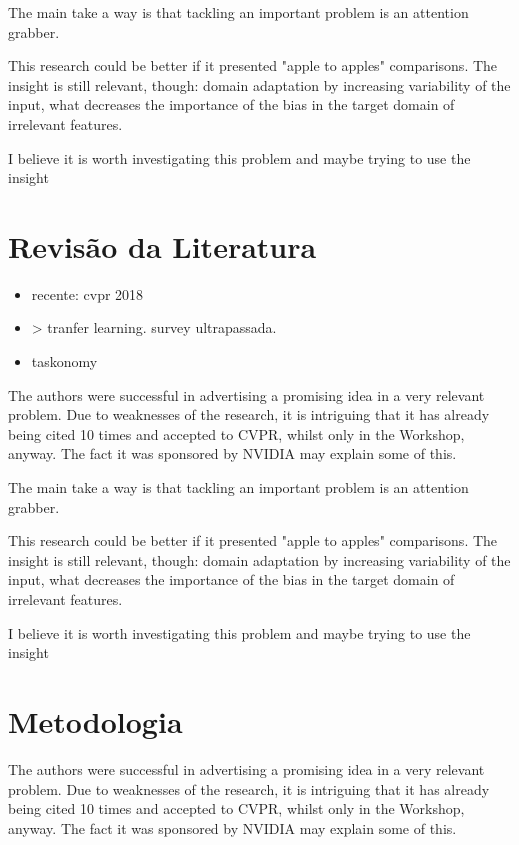 \documentclass[
12pt, %
a4paper, %
onecolumn, %
]{article}
\begin{document}
The main take a way is that tackling an important problem is an attention grabber. 

This research could be better if it presented "apple to apples" comparisons. The insight is still relevant, though: domain adaptation by increasing variability of the input, what decreases the importance of the bias in the target domain of irrelevant features.

I believe it is worth investigating this problem and maybe trying to use the insight


\section{Revisão da Literatura}

\begin{itemize}


  \item recente: cvpr 2018  \item> tranfer learning. survey ultrapassada.
  \item taskonomy
\end{itemize}



The authors were successful in advertising a promising idea in a very relevant problem.  Due to weaknesses of the research, it is intriguing that it has already being cited 10 times and accepted to CVPR, whilst only in the Workshop, anyway. The fact it was sponsored by NVIDIA may explain some of this.

The main take a way is that tackling an important problem is an attention grabber. 

This research could be better if it presented "apple to apples" comparisons. The insight is still relevant, though: domain adaptation by increasing variability of the input, what decreases the importance of the bias in the target domain of irrelevant features.

I believe it is worth investigating this problem and maybe trying to use the insight


\section{Metodologia}

The authors were successful in advertising a promising idea in a very relevant problem.  Due to weaknesses of the research, it is intriguing that it has already being cited 10 times and accepted to CVPR, whilst only in the Workshop, anyway. The fact it was sponsored by NVIDIA may explain some of this.
\end{document}

